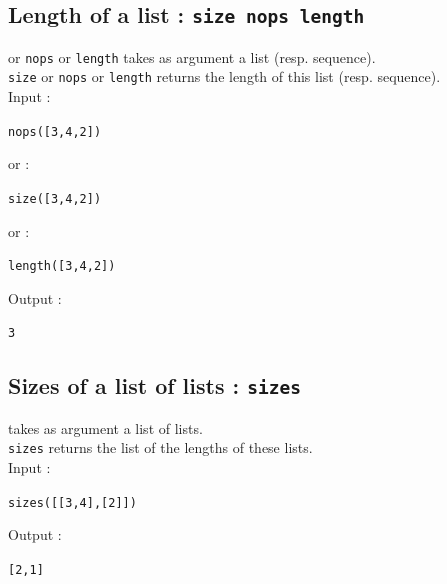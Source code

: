 \documentclass[a4paper,11pt]{book}
\begin{document}
\subsection{Length of a list : {\tt size nops length}}
 or {\tt nops} or {\tt length} takes as argument a list 
(resp. sequence).\\
{\tt size} or {\tt nops} or {\tt length} returns the length of this list (resp. 
 sequence).\\
Input :
\begin{center}{\tt nops([3,4,2])}\end{center}
or :
\begin{center}{\tt size([3,4,2])}\end{center}
or :
\begin{center}{\tt length([3,4,2])}\end{center}
Output :
\begin{center}{\tt  3}\end{center}

\subsection{Sizes of a list of lists : {\tt sizes}}
 takes as argument a list of lists.\\
{\tt sizes} returns the list of the lengths of these lists.\\
Input :
\begin{center}{\tt sizes([[3,4],[2]])}\end{center}
Output :
\begin{center}{\tt [2,1]}\end{center}
\end{document}
